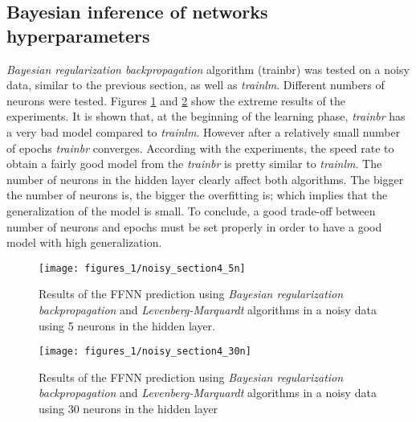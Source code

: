 \subsection{Bayesian inference of networks hyperparameters}
\textit{Bayesian regularization backpropagation} algorithm (trainbr) was tested on a noisy data, similar to the previous section, as well as \textit{trainlm}. Different numbers of neurons were tested. Figures \ref{noisy_section24} and \ref{noisy_section25} show the extreme results of the experiments.
\bigbreak
It is shown that, at the beginning of the learning phase,  \textit{trainbr} has a very bad model compared to \textit{trainlm}. However after a relatively small number of epochs \textit{trainbr} converges. According with the experiments, the speed rate to obtain a fairly good model from the \textit{trainbr} is pretty similar to \textit{trainlm}. The number of neurons in the hidden layer clearly affect both algorithms. The bigger the number of neurons is, the bigger the overfitting is; which implies that the generalization of the model is small. To conclude, a good trade-off between number of neurons and epochs must be set properly in order to have a good model with high generalization.
\begin{figure}[!htbp]
\caption{Results of the FFNN prediction using \textit{Bayesian regularization backpropagation} and \textit{Levenberg-Marquardt} algorithms in a noisy data using 5 neurons in the hidden layer.}
\label{noisy_section24}
\texttt{[image: figures\_1/noisy\_section4\_5n]}
\centering
\end{figure}

\begin{figure}[!htbp]
\caption{Results of the FFNN prediction using \textit{Bayesian regularization backpropagation} and \textit{Levenberg-Marquardt} algorithms in a noisy data using 30 neurons in the hidden layer}
\label{noisy_section25}
\texttt{[image: figures\_1/noisy\_section4\_30n]}
\centering
\end{figure}